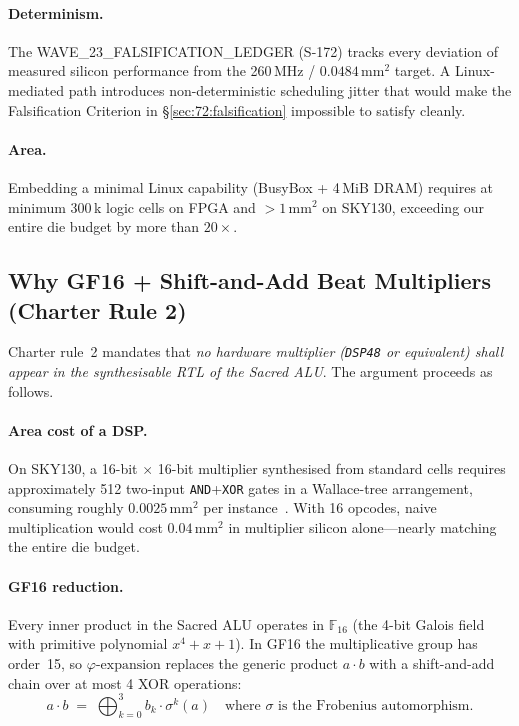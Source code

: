\paragraph{Determinism.}
The WAVE\_23\_FALSIFICATION\_LEDGER (S-172) tracks every deviation of
measured silicon performance from the 260\,MHz / $0.0484\,\mathrm{mm}^2$
target.
A Linux-mediated path introduces non-deterministic scheduling jitter that
would make the Falsification Criterion in \S\ref{sec:72:falsification}
impossible to satisfy cleanly.

\paragraph{Area.}
Embedding a minimal Linux capability (BusyBox + 4\,MiB DRAM) requires at
minimum 300\,k logic cells on FPGA and $> 1\,\mathrm{mm}^2$ on SKY130,
exceeding our entire die budget by more than $20\times$.

\subsection{Why GF16 + Shift-and-Add Beat Multipliers (Charter Rule 2)}
\label{subsec:72:rule2}

Charter rule~2 mandates that \emph{no hardware multiplier (\texttt{DSP48}
or equivalent) shall appear in the synthesisable RTL of the Sacred ALU}.
The argument proceeds as follows.

\paragraph{Area cost of a DSP.}
On SKY130, a 16-bit $\times$ 16-bit multiplier synthesised from standard
cells requires approximately 512 two-input \texttt{AND}+\texttt{XOR} gates
in a Wallace-tree arrangement, consuming roughly $0.0025\,\mathrm{mm}^2$
per instance~\cite{booth1951signed}.
With 16 opcodes, naive multiplication would cost $0.04\,\mathrm{mm}^2$
in multiplier silicon alone—nearly matching the entire die budget.

\paragraph{GF16 reduction.}
Every inner product in the Sacred ALU operates in $\mathbb{F}_{16}$
(the 4-bit Galois field with primitive polynomial $x^4+x+1$).
In GF16 the multiplicative group has order~15, so
$\varphi\text{-expansion}$ replaces the generic product $a \cdot b$ with a
shift-and-add chain over at most 4 XOR operations:
\[
  a \cdot b \;=\; \bigoplus_{k=0}^{3} b_k \cdot \sigma^k(a)
  \quad \text{where } \sigma \text{ is the Frobenius automorphism.}
\]

